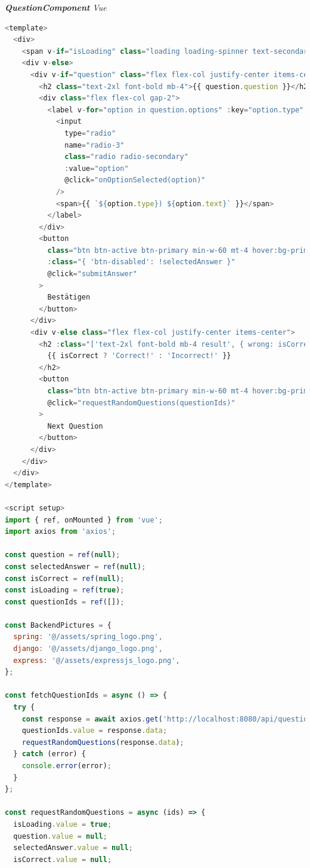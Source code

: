 \documentclass[biblatex]{lni}
\begin{document}
\textit{\textbf{QuestionComponent} Vue} \\
\begin{lstlisting}[caption={QuestionComponent.vue}, label=qc-ve, language=javascript]
<template>
  <div>
    <span v-if="isLoading" class="loading loading-spinner text-secondary"></span>
    <div v-else>
      <div v-if="question" class="flex flex-col justify-center items-center">
        <h2 class="text-2xl font-bold mb-4">{{ question.question }}</h2>
        <div class="flex flex-col gap-2">
          <label v-for="option in question.options" :key="option.type" class="flex items-center gap-2">
            <input
              type="radio"
              name="radio-3"
              class="radio radio-secondary"
              :value="option"
              @click="onOptionSelected(option)"
            />
            <span>{{ `${option.type}) ${option.text}` }}</span>
          </label>
        </div>
        <button
          class="btn btn-active btn-primary min-w-60 mt-4 hover:bg-primary-dark"
          :class="{ 'btn-disabled': !selectedAnswer }"
          @click="submitAnswer"
        >
          Bestätigen
        </button>
      </div>
      <div v-else class="flex flex-col justify-center items-center">
        <h2 :class="['text-2xl font-bold mb-4 result', { wrong: isCorrect === false }]">
          {{ isCorrect ? 'Correct!' : 'Incorrect!' }}
        </h2>
        <button
          class="btn btn-active btn-primary min-w-60 mt-4 hover:bg-primary-dark"
          @click="requestRandomQuestions(questionIds)"
        >
          Next Question
        </button>
      </div>
    </div>
  </div>
</template>

<script setup>
import { ref, onMounted } from 'vue';
import axios from 'axios';

const question = ref(null);
const selectedAnswer = ref(null);
const isCorrect = ref(null);
const isLoading = ref(true);
const questionIds = ref([]);

const BackendPictures = {
  spring: '@/assets/spring_logo.png',
  django: '@/assets/django_logo.png',
  express: '@/assets/expressjs_logo.png',
};

const fetchQuestionIds = async () => {
  try {
    const response = await axios.get('http://localhost:8080/api/question/ids');
    questionIds.value = response.data;
    requestRandomQuestions(response.data);
  } catch (error) {
    console.error(error);
  }
};

const requestRandomQuestions = async (ids) => {
  isLoading.value = true;
  question.value = null;
  selectedAnswer.value = null;
  isCorrect.value = null;


\end{lstlisting}
\end{document}
